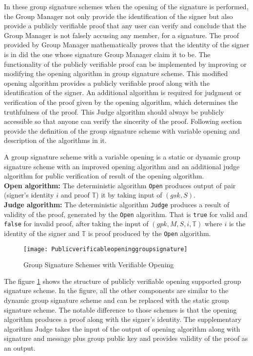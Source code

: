In these group signature schemes when the opening of the signature is performed, the Group Manager not only provide the identification of the signer but also provide a publicly verifiable proof that any user can verify and conclude that the Group Manager is not falsely accusing any member, for a signature. The proof provided by Group Manager mathematically proves that the identity of the signer is in did the one whose signature Group Manager claim it to be. The functionality of the publicly verifiable proof can be implemented by improving or modifying the opening algorithm in group signature scheme. This modified opening algorithm provides a publicly verifiable proof along with the identification of the signer. An additional algorithm is required for judgment or verification of the proof given by the opening algorithm, which determines the truthfulness of the proof. This Judge algorithm should always be publicly accessible so that anyone can verify the sincerity of the proof. Following section provide the definition of the group signature scheme with variable opening and description of the algorithms in it.

\begin{definition} A group signature scheme with a variable opening is a static or dynamic group signature scheme with an improved opening algorithm and an additional judge algorithm for public verification of result of the opening algorithm.\\
\textbf{Open algorithm:} The deterministic algorithm \texttt{Open} produces output of pair (signer's identity $i$ and proof $\mathbb{T}$) it by taking input of $(gsk, S)$.\\
\textbf{Judge algorithm:} The deterministic algorithm \texttt{Judge} produces a result of validity of the proof, generated by the \texttt{Open} algorithm. That is \texttt{true} for valid and \texttt{false} for invalid proof, after taking the input of $(gpk, M, S, i, \mathbb{T})$ where $i$ is the identity of the signer and $\mathbb{T}$ is proof produced by the \texttt{Open} algorithm.
\end{definition}
\begin{figure}[h]
    \centering
    \texttt{[image: Publicverificableopeninggroupsignature]}
    \caption{Group Signature Schemes with Verifiable Opening}
    \label{fig:Public verificable opening group signature}
\end{figure}
The figure \ref{fig:Public verificable opening group signature} shows the structure of publicly verifiable opening supported group signature scheme. In the figure, all the other components are similar to the dynamic group signature scheme and can be replaced with the static group signature scheme. The notable difference to those schemes is that the opening algorithm produces a proof along with the signer's identity. The supplementary algorithm Judge takes the input of the output of opening algorithm along with signature and message plus group public key and provides validity of the proof as an output. 

